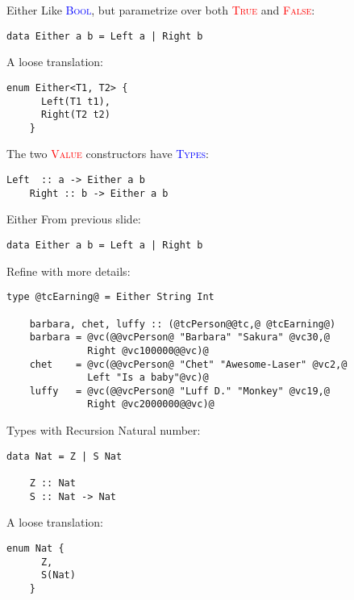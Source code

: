 \documentclass[xcolor={usenames,dvipsnames}]{beamer}
\newcommand{\htycon}[1]{\textcolor{Blue}{\textsc{#1}}}
\newcommand{\hvalcon}[1]{\textcolor{Red}{\textsc{#1}}}
\begin{document}
\begin{frame}[fragile]{Either}
  Like \htycon{Bool}, but parametrize over both \hvalcon{True} and \hvalcon{False}:
  \begin{lstlisting}[style=hask]
    data Either a b = Left a | Right b
  \end{lstlisting}

  \pause
  A loose translation:
  \begin{lstlisting}[style=hask]
    enum Either<T1, T2> {
      Left(T1 t1),
      Right(T2 t2)
    }
  \end{lstlisting}

  \pause
  The two \hvalcon{Value} constructors have \htycon{Types}:
  \begin{lstlisting}[style=hask]
    Left  :: a -> Either a b
    Right :: b -> Either a b
  \end{lstlisting}
\end{frame}

\begin{frame}[fragile]{Either}
  From previous slide:
  \begin{lstlisting}[style=hask]
    data Either a b = Left a | Right b
  \end{lstlisting}

  \pause
  Refine with more details:
  \begin{lstlisting}[style=hask]
    type @tcEarning@ = Either String Int

    barbara, chet, luffy :: (@tcPerson@@tc,@ @tcEarning@)
    barbara = @vc(@@vcPerson@ "Barbara" "Sakura" @vc30,@
              Right @vc100000@@vc)@
    chet    = @vc(@@vcPerson@ "Chet" "Awesome-Laser" @vc2,@
              Left "Is a baby"@vc)@ 
    luffy   = @vc(@@vcPerson@ "Luff D." "Monkey" @vc19,@
              Right @vc2000000@@vc)@
  \end{lstlisting}
\end{frame}

\begin{frame}[fragile]{Types with Recursion}
  Natural number:
  \begin{lstlisting}[style=hask]
    data Nat = Z | S Nat

    Z :: Nat
    S :: Nat -> Nat
  \end{lstlisting}

  \pause
  A loose translation:
  \begin{lstlisting}[style=hask]
    enum Nat {
      Z,
      S(Nat)
    }
  \end{lstlisting}
\end{frame}
\end{document}
